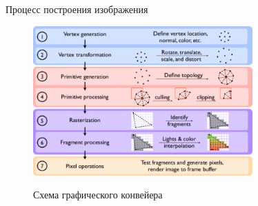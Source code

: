 \documentclass{beamer}
\begin{document}
	\begin{frame}{Процесс построения изображения}
		\begin{figure} 
			\href{https://www.researchgate.net/figure/Outline-of-the-graphics-pipeline_fig1_281810652}{
				\includegraphics[width=0.75\textwidth]{images/Outline-of-the-graphics-pipeline.png}}
			\caption{Схема графического конвейера}
		\end{figure}
	\end{frame}
\end{document}
